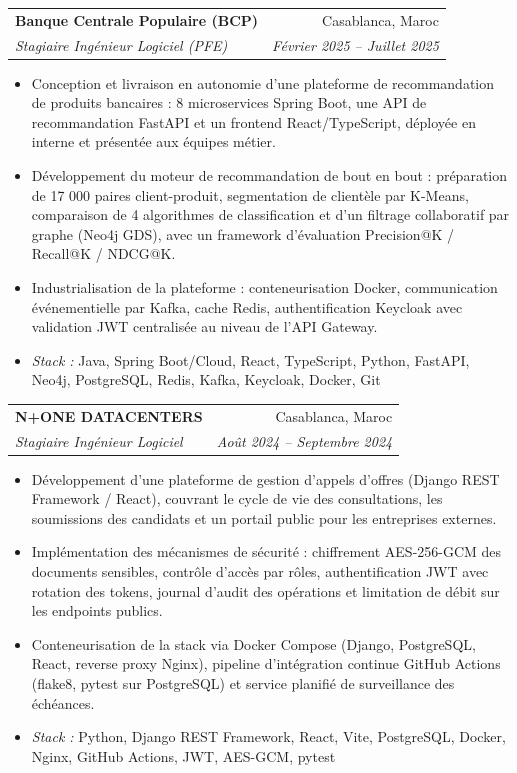\documentclass[letterpaper,11pt]{article}
\makeatletter
\newcommand{\resumeSubheading}[4]{
  \vspace{-1pt}\item
    \begin{tabular*}{0.97\textwidth}{l@{\extracolsep{\fill}}r}
      \textbf{#1} & #2 \\
      \textit{\small#3} & \textit{\small #4} \\
    \end{tabular*}\vspace{-5pt}
}
\newcommand{\resumeItemListStart}{\begin{itemize}}
\newcommand{\resumeItemListEnd}{\end{itemize}\vspace{-5pt}}
\makeatother
\begin{document}
\resumeSubheading
  {Banque Centrale Populaire (BCP)}{Casablanca, Maroc}
  {Stagiaire Ingénieur Logiciel (PFE)}{Février 2025 -- Juillet 2025}
  \resumeItemListStart
    \item Conception et livraison en autonomie d'une plateforme de recommandation de produits
      bancaires : 8 microservices Spring Boot, une API de recommandation FastAPI et un
      frontend React/TypeScript, déployée en interne et présentée aux équipes métier.
    \item Développement du moteur de recommandation de bout en bout : préparation de 17 000
      paires client-produit, segmentation de clientèle par K-Means, comparaison de 4
      algorithmes de classification et d'un filtrage collaboratif par graphe (Neo4j GDS),
      avec un framework d'évaluation Precision@K / Recall@K / NDCG@K.
    \item Industrialisation de la plateforme : conteneurisation Docker, communication
      événementielle par Kafka, cache Redis, authentification Keycloak avec validation JWT
      centralisée au niveau de l'API Gateway.
    \item \textit{Stack :} Java, Spring Boot/Cloud, React, TypeScript, Python, FastAPI, Neo4j,
      PostgreSQL, Redis, Kafka, Keycloak, Docker, Git
  \resumeItemListEnd

\resumeSubheading
  {N+ONE DATACENTERS}{Casablanca, Maroc}
  {Stagiaire Ingénieur Logiciel}{Août 2024 -- Septembre 2024}
  \resumeItemListStart
    \item Développement d'une plateforme de gestion d'appels d'offres (Django REST Framework /
      React), couvrant le cycle de vie des consultations, les soumissions des candidats et un
      portail public pour les entreprises externes.
    \item Implémentation des mécanismes de sécurité : chiffrement AES-256-GCM des documents
      sensibles, contrôle d'accès par rôles, authentification JWT avec rotation des tokens,
      journal d'audit des opérations et limitation de débit sur les endpoints publics.
    \item Conteneurisation de la stack via Docker Compose (Django, PostgreSQL, React, reverse
      proxy Nginx), pipeline d'intégration continue GitHub Actions (flake8, pytest sur
      PostgreSQL) et service planifié de surveillance des échéances.
    \item \textit{Stack :} Python, Django REST Framework, React, Vite, PostgreSQL, Docker,
      Nginx, GitHub Actions, JWT, AES-GCM, pytest
  \resumeItemListEnd
\end{document}
